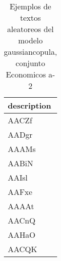 \begin{table}[H]
\centering
\fontsize{8}{14}\selectfont
\caption{Ejemplos de textos aleatoreos del modelo gaussiancopula, conjunto Economicos a-2}
\label{table-sample10-economicos-a-2-gaussiancopula-text}
\begin{tabular}{|m{50em}|}
\hline
\rowcolor[gray]{0.8}
description \\
\hline AACZf \\
\hline AADgr \\
\hline AAAMs \\
\hline AABiN \\
\hline AAIsl \\
\hline AAFxe \\
\hline AAAAt \\
\hline AACnQ \\
\hline AAHaO \\
\hline AACQK \\
\hline
\end{tabular}
\end{table}
